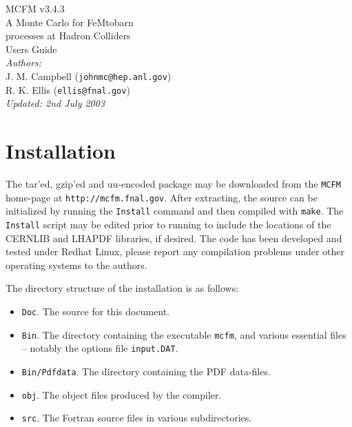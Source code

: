 \documentclass[12pt]{article}
\begin{document}
\def\GeV{\mbox{GeV}}

\thispagestyle{empty}
\vspace*{3cm}
\begin{center}
{\Huge MCFM v3.4.3} \\
\vspace*{0.5cm}
\Large{A Monte Carlo for FeMtobarn} \\
\Large{processes at Hadron Colliders} \\
\vspace*{2cm}
{\huge Users Guide} \\
\vspace*{4cm}
{\it Authors:} \\
\vspace*{0.2cm}
J. M. Campbell ({\tt johnmc@hep.anl.gov}) \\
R. K. Ellis ({\tt ellis@fnal.gov}) \\
\vspace*{2.5cm}
{\it \small Updated: 2nd July 2003}
\end{center}

\newpage

\section{Installation}

The tar'ed, gzip'ed and uu-encoded package may be downloaded from
the {\tt MCFM} home-page at {\tt http://mcfm.fnal.gov}.
After extracting, the source can be initialized by running the
{\tt Install} command and then compiled with {\tt make}. The
{\tt Install} script may be edited prior to running to include
the locations of the CERNLIB and LHAPDF libraries, if desired.
The code has been developed and tested under Redhat Linux, please report
any compilation problems under other operating systems to the authors.

The directory structure of the installation is as follows:
\begin{itemize}
\item {\tt Doc}. The source for this document.
\item {\tt Bin}. The directory containing the executable {\tt mcfm},
and various essential files -- notably the options file {\tt input.DAT}.
\item {\tt Bin/Pdfdata}. The directory containing the PDF data-files.
\item {\tt obj}. The object files produced by the compiler. 
\item {\tt src}. The Fortran source files in various subdirectories.
\end{itemize}
\end{document}
